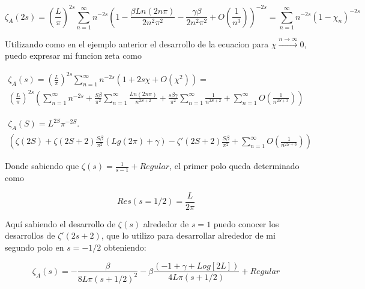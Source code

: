 \begin{equation}
    \zeta _A (2 s) = ( \frac{L}{\pi} )  ^{2 s} 
    \sum _{n=1} ^{\infty} n ^{- 2  s}
    \left(
    1 - \frac{\beta Ln(2 n \pi)}{2 n^2 \pi ^2} - \frac{\gamma \beta}{2 n^2 \pi ^2 } +
    O(\frac{1}{n^3})  \right) ^{-2 s} =
    \sum _{n=1} ^{\infty} n ^{-2 s} 
    \left(
    1 -\chi _n \right) ^{- 2 s}
\end{equation}

Utilizando como en el ejemplo anterior el desarrollo de la ecuacion para $\chi \xrightarrow{n \rightarrow \infty} 0$, puedo expresar mi funcion zeta como 


\begin{equation}
\begin{array}{c}
    \zeta _A (s) = ( \frac{L}{\pi} ) ^{2 s}
    \sum _{n=1} ^{\infty} 
    n ^{-2s}
    \left(
    1 + 2 s \chi + O(\chi ^2)
    \right) =  \\
    ( \frac{L}{\pi} ) ^{2 s}
    \left(
    \sum _{n=1} ^{\infty} n ^{-2 s} + 
    \frac{S \beta}{\pi ^2} \sum _{n=1} ^{\infty} \frac{Ln(2 n \pi)}{n^ {2S+2} } + 
    \frac{s \beta \gamma}{\pi ^2} 
    \sum _{n=1} ^{\infty} \frac{1}{n^{2S+2}} +
    \sum _{n=1} ^{\infty} O(\frac{1}{n^{2S+3} })
    \right)
\end{array}
\end{equation}


\begin{equation}
\begin{array}{c}
    \zeta _A (S) = 
    L ^{2S} \pi ^{-2 S} . \\
    \left(
    \zeta (2 S) + 
    \zeta (2S+2) \frac{S \beta}{\pi ^2} (Lg(2  \pi)+\gamma) -
    \zeta ' (2S+2) \frac{S \beta}{\pi ^2} +
    \sum _{n=1} ^{\infty} O(\frac{1}{n^{2S+3}})
    \right)
\end{array}
\end{equation}

Donde sabiendo que $\zeta(s) = \frac{1}{s-1} + Regular$, el primer polo queda determinado como

\begin{equation}
    Res(s=1/2) = \frac{L}{2 \pi}    
\end{equation}

Aquí sabiendo el desarrollo de $\zeta(s)$ alrededor de $s=1$ puedo conocer los desarrollos de $\zeta'(2s+2)$, que lo utilizo para desarrollar alrededor de mi segundo polo en $s = -1/2$ obteniendo:

\begin{equation}
    \zeta _A (s) = -\frac{\beta}{8 L \pi (s+1/2)^2} -
    \beta \frac{(-1 + \gamma + Log[2L ])}{4 L \pi (s+1/2)} + 
    Regular
\end{equation}

